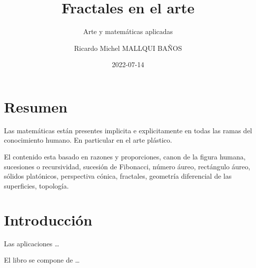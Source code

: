 \documentclass[
  11pt,
]{krantz}
\title{Fractales en el arte}
\subtitle{Arte y matemáticas aplicadas}
\author{Ricardo Michel MALLQUI BAÑOS}
\date{2022-07-14}
\theoremstyle{definition}
\theoremstyle{definition}
\theoremstyle{definition}
\theoremstyle{definition}
\theoremstyle{remark}
\begin{document}
\maketitle

\thispagestyle{empty}
\begin{center}
\end{center}


{
\hypersetup{linkcolor=}
\setcounter{tocdepth}{2}
\tableofcontents
}
\listoftables
\listoffigures
\newcommand{\N}{\mathbb{N}}
\newcommand{\R}{\mathbb{R}}
\newcommand{\CC}{\mathbb{C}}
\newcommand{\I}{\mathbb{I}}
\newcommand{\f}{\mathbb{f}}
\newcommand{\X}{\mathbb{X}}
\newcommand{\D}{\mathbb{D}}
\newcommand{\Z}{\mathbb{Z}}
\newcommand{\Q}{\mathbb{Q}}
\newcommand{\norm}[1]{\left\Vert#1\right\Vert}
\newcommand{\abs}[1]{\left\vert#1\right\vert}
\newcommand{\set}[1]{\left\{#1\right\}}
\newcommand{\seq}[1]{\left<#1\right>}
\newcommand{\co}[1]{\left[#1\right]}
\newcommand{\cc}[1]{\left(#1\right)}
\newcommand{\J}{\mathcal{J}}
\newcommand{\K}{\mathcal{K}}
\newcommand{\M}{\mathcal{M}}
\newcommand{\F}{\mathcal{F}}

\hypertarget{resumen}{%
\chapter*{Resumen}\label{resumen}}


Las matemáticas están presentes implicita e explicitamente en todas las ramas del conocimiento humano. En particular en el arte plástico.

El contenido esta basado en razones y proporciones, canon de la figura humana, sucesiones o recursividad, sucesión de Fibonacci, número áureo, rectángulo áureo, sólidos platónicos, perspectiva cónica, fractales, geometría diferencial de las superficies, topología.

\hypertarget{introducciuxf3n}{%
\chapter*{Introducción}\label{introducciuxf3n}}


Las aplicaciones \ldots{}

El libro se compone de \ldots{}

\mainmatter
\end{document}
